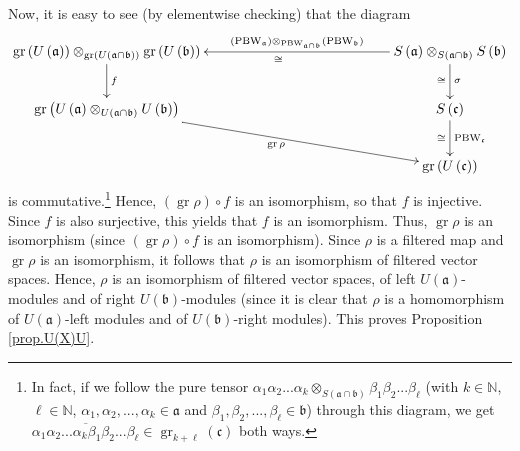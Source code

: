 \documentclass
[numbers=enddot,12pt,final,onecolumn,german,notitlepage]{scrartcl}%
\newcommand{\gr}{\operatorname*{gr}}
\newcommand{\fraka}{\mathfrak{a}}
\newcommand{\frakb}{\mathfrak{b}}
\newcommand{\frakc}{\mathfrak{c}}
\newcommand{\PBW}{\operatorname*{PBW}}
\theoremstyle{definition}
\begin{document}
Now, it is easy to see (by elementwise checking) that the diagram%
\[%
\xymatrixcolsep{11pc}
\xymatrix{
\gr\left(U\left(\fraka\right)\right) \otimes_{\gr\left(U\left(\fraka\cap
\frakb\right)\right)} \gr\left(U\left(\frakb\right)\right) \ar[d]^{f}
& S\left(\fraka\right) \otimes_{S\left(\fraka\cap\frakb\right)} S\left
(\frakb\right) \ar[l]_-{\left(\PBW_{\fraka}\right) \otimes_{\PBW_{\fraka
\cap\frakb}} \left(\PBW_{\frakb}\right)}^{\cong} \ar[d]_{\cong}^{\sigma} \\
\gr\left(U\left(\fraka\right) \otimes_{U\left(\fraka\cap\frakb\right)}
U\left(\frakb\right)\right) \ar[dr]_{\gr\rho} & S\left(\frakc\right
) \ar[d]^{\PBW_{\frakc}}_{\cong} \\
& \gr\left(U\left(\frakc\right)\right)
}%
\]
is commutative.\footnote{In fact, if we follow the pure tensor $\alpha
_{1}\alpha_{2}...\alpha_{k}\otimes_{S\left(  \mathfrak{a}\cap\mathfrak{b}%
\right)  }\beta_{1}\beta_{2}...\beta_{\ell}$ (with $k\in\mathbb{N}$, $\ell
\in\mathbb{N}$, $\alpha_{1},\alpha_{2},...,\alpha_{k}\in\mathfrak{a}$ and
$\beta_{1},\beta_{2},...,\beta_{\ell}\in\mathfrak{b}$) through this diagram,
we get $\overline{\alpha_{1}\alpha_{2}...\alpha_{k}\beta_{1}\beta_{2}%
...\beta_{\ell}}\in\operatorname*{gr}\nolimits_{k+\ell}\left(  \mathfrak{c}%
\right)  $ both ways.} Hence, $\left(  \operatorname*{gr}\rho\right)  \circ f$
is an isomorphism, so that $f$ is injective. Since $f$ is also surjective,
this yields that $f$ is an isomorphism. Thus, $\operatorname*{gr}\rho$ is an
isomorphism (since $\left(  \operatorname*{gr}\rho\right)  \circ f$ is an
isomorphism). Since $\rho$ is a filtered map and $\operatorname*{gr}\rho$ is
an isomorphism, it follows that $\rho$ is an isomorphism of filtered vector
spaces. Hence, $\rho$ is an isomorphism of filtered vector spaces, of left
$U\left(  \mathfrak{a}\right)  $-modules and of right $U\left(  \mathfrak{b}%
\right)  $-modules (since it is clear that $\rho$ is a homomorphism of
$U\left(  \mathfrak{a}\right)  $-left modules and of $U\left(  \mathfrak{b}%
\right)  $-right modules). This proves Proposition \ref{prop.U(X)U}.
\end{document}
